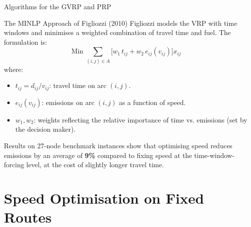 \documentclass[aspectratio=169,10pt]{beamer}
\begin{document}
\begin{frame}[allowframebreaks]{Algorithms for the GVRP and PRP}
  \begin{block}{The MINLP Approach of Figliozzi (2010)}
    Figliozzi models the VRP with time windows and minimises a weighted
    combination of travel time and fuel.  The formulation is:
    \[
      \text{Min}\; \sum_{(i,j)\in A} \bigl[w_1\, t_{ij} + w_2\, e_{ij}(v_{ij})\bigr] x_{ij}
    \]
    where:
    \begin{itemize}
      \item $t_{ij} = d_{ij}/v_{ij}$: travel time on arc $(i,j)$.
      \item $e_{ij}(v_{ij})$: emissions on arc $(i,j)$ as a function of speed.
      \item $w_1, w_2$: weights reflecting the relative importance of time vs.
      emissions (set by the decision maker).
    \end{itemize}
    Results on 27-node benchmark instances show that optimising speed reduces
    emissions by an average of \textbf{9\%} compared to fixing speed at the
    time-window-forcing level, at the cost of slightly longer travel time.
  \end{block}

\end{frame}

\section{Speed Optimisation on Fixed Routes}
\end{document}

